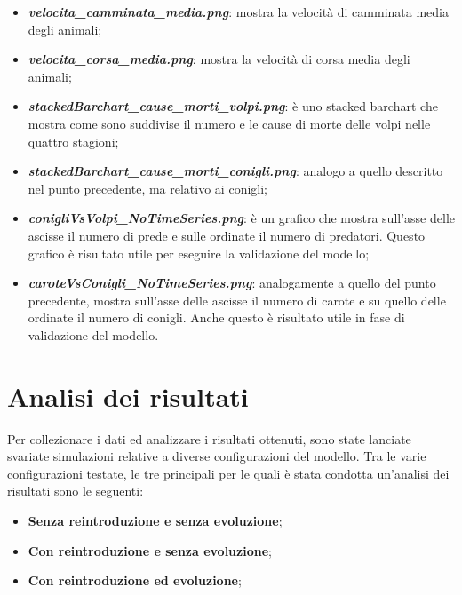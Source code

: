 \documentclass[11pt]{article}
\begin{document}
\begin{itemize}
\begin{itemize}
        \item \textbf{\textit{velocita\_camminata\_media.png}}: mostra la velocità di camminata media degli animali;
        \item \textbf{\textit{velocita\_corsa\_media.png}}: mostra la velocità di corsa media degli animali;
        \item \textbf{\textit{stackedBarchart\_cause\_morti\_volpi.png}}: è uno stacked barchart che mostra come sono suddivise il numero e le cause di morte delle volpi nelle quattro stagioni;
        \item \textbf{\textit{stackedBarchart\_cause\_morti\_conigli.png}}: analogo a quello descritto nel punto precedente, ma relativo ai conigli;
        \item \textbf{\textit{conigliVsVolpi\_NoTimeSeries.png}}: è un grafico che mostra sull'asse delle ascisse il numero di prede e sulle ordinate il numero di predatori. Questo grafico è risultato utile per eseguire la validazione del modello;
        \item \textbf{\textit{caroteVsConigli\_NoTimeSeries.png}}: analogamente a quello del punto precedente, mostra sull'asse delle ascisse il numero di carote e su quello delle ordinate il numero di conigli. Anche questo è risultato utile in fase di validazione del modello.
    \end{itemize}
\end{itemize}


\section{Analisi dei risultati}
Per collezionare i dati ed analizzare i risultati ottenuti, sono state lanciate svariate simulazioni relative a diverse configurazioni del modello. Tra le varie configurazioni testate, le tre principali per le quali è stata condotta un'analisi dei risultati sono le seguenti: 
\begin{itemize}
    \item \textbf{Senza reintroduzione e senza evoluzione};
    \item \textbf{Con reintroduzione e senza evoluzione};
    \item \textbf{Con reintroduzione ed evoluzione};
\end{itemize}

\vspace{1cm}
\end{document}
